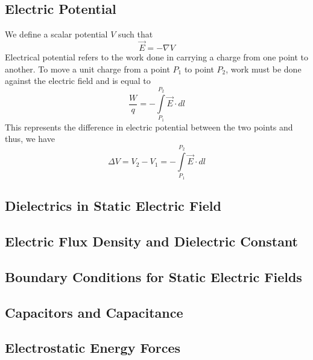 \documentclass[11pt]{article}
\begin{document}
\subsection{Electric Potential}
We define a scalar potential $V$ such that 
$$ \vec{E} = -\nabla V$$
Electrical potential refers to the work done in carrying a charge from one point to another. To move a unit charge from a point $P_1$ to point $P_2$, work must be done against the electric field and is equal to 
$$ \frac{W}{q} = - \int \limits_{P_1}^{P_2} \vec{E} \cdot dl $$
This represents the difference in electric potential between the two points and thus, we have
$$ \Delta V = V_2 - V_1 = - \int \limits_{P_1}^{P_2} \vec{E} \cdot dl $$


\subsection{Dielectrics in Static Electric Field}

\subsection{Electric Flux Density and Dielectric Constant}

\subsection{Boundary Conditions for Static Electric Fields}

\subsection{Capacitors and Capacitance}

\subsection{Electrostatic Energy Forces}
\end{document}
